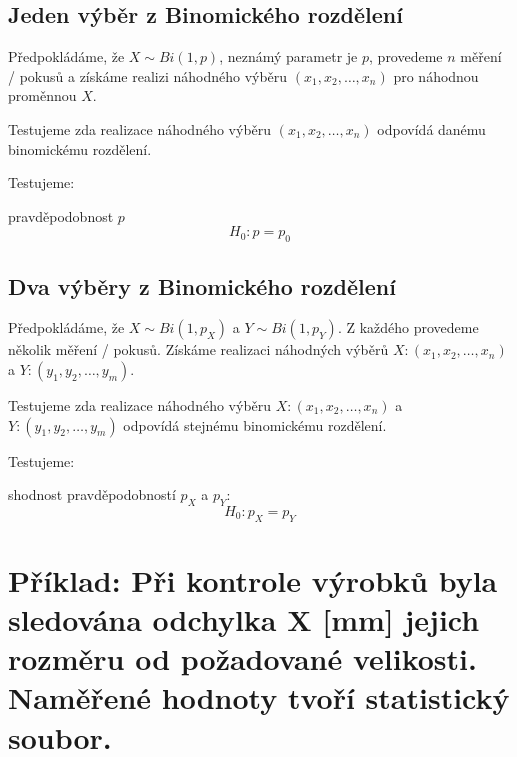 \subsection{Jeden výběr z Binomického rozdělení}

\begin{compactitem}
    \item Předpokládáme, že $X \sim Bi(1, p)$, neznámý parametr je $p$, provedeme $n$  měření / pokusů a získáme realizi náhodného výběru $(x_1, x_2, \ldots, x_n)$ pro náhodnou proměnnou $X$.

    \item Testujeme zda realizace náhodného výběru $(x_1, x_2, \ldots, x_n)$ odpovídá danému binomickému rozdělení.

    \item Testujeme: \begin{compactitem}
        \item pravděpodobnost $p$
        $$ H_0 : p = p_0 $$
    \end{compactitem}
\end{compactitem}

\subsection{Dva výběry z Binomického rozdělení}

\begin{compactitem}
    \item Předpokládáme, že $X \sim Bi(1, p_X)$ a $Y \sim Bi(1, p_Y)$. Z každého provedeme několik měření / pokusů. Získáme realizaci náhodných výběrů $X: (x_1, x_2, \ldots, x_n)$ a $Y: (y_1, y_2, \ldots, y_m)$.

    \item Testujeme zda realizace náhodného výběru $X : (x_1, x_2, \ldots, x_n)$ a $Y: (y_1, y_2, \ldots, y_m)$ odpovídá stejnému binomickému rozdělení.

    \item Testujeme: \begin{compactitem}
        \item shodnost pravděpodobností $p_X$ a $p_Y$:
        $$ H_0 : p_X = p_Y $$
    \end{compactitem}
\end{compactitem}


\section{Příklad: Při kontrole výrobků byla sledována odchylka X [mm] jejich rozměru od požadované velikosti. Naměřené hodnoty tvoří statistický soubor.}

